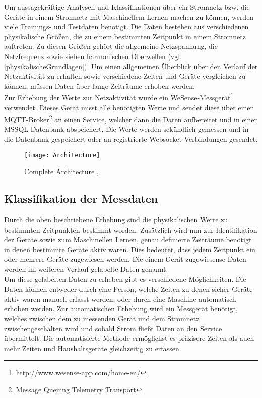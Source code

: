     Um aussagekräftige Analysen und Klassifikationen über ein Stromnetz bzw. die Geräte in einem Stromnetz mit Maschinellem Lernen machen zu können, werden viele Trainings- und Testdaten benötigt.
    Die Daten bestehen aus verschiedenen physikalische Größen, die zu einem bestimmten Zeitpunkt in einem Stromnetz auftreten.
    Zu diesen Größen gehört die allgemeine Netzspannung, die Netzfrequenz sowie sieben harmonischen Oberwellen (vgl. \ref{physikalischeGrundlagen}).
    Um einen allgemeinen Überblick über den Verlauf der Netzaktivität zu erhalten sowie verschiedene Zeiten und Geräte vergleichen zu können, müssen Daten über lange Zeiträume erhoben werden.\\
    \newline
    Zur Erhebung der Werte zur Netzaktivität wurde ein WeSense-Messgerät\footnote{http://www.wesense-app.com/home-en/} verwendet.
    Dieses Gerät misst alle benötigten Werte und sendet diese über einen MQTT-Broker\footnote{Message Queuing Telemetry Transport} an einen Service, welcher dann die Daten aufbereitet und in einer MSSQL Datenbank abspeichert.
    Die Werte werden sekündlich gemessen und in die Datenbank gespeichert oder an registrierte Websocket-Verbindungen gesendet.
    \newline

    \begin{figure}[h]
        \centering
        \texttt{[image: Architecture]}
        \caption{Complete Architecture \protect\cite{DrawIO}, \protect\cite{Tensorflow}}
        \label{fig:Architecture}
    \end{figure}

    \subsection{Klassifikation der Messdaten}\label{KlassifikationDerMessdaten}

        Durch die oben beschriebene Erhebung sind die physikalischen Werte zu bestimmten Zeitpunkten bestimmt worden.
        Zusätzlich wird nun zur Identifikation der Geräte sowie zum Maschinellen Lernen, genau definierte Zeiträume benötigt in denen bestimmte Geräte aktiv waren.
        Dies bedeutet, dass jedem Zeitpunkt ein oder mehrere Geräte zugewiesen werden. Die einem Gerät zugewiesense Daten werden im weiteren Verlauf gelabelte Daten genannt.\\
        \newline
        Um diese gelabelten Daten zu erheben gibt es verschiedene Möglichkeiten.
        Die Daten können entweder durch eine Person, welche Zeiten zu denen sicher Geräte aktiv waren manuell erfasst werden, oder durch eine Maschine automatisch erhoben werden.
        Zur automatischen Erhebung wird ein Messgerät benötigt, welches zwischen dem zu messenden Gerät und dem Stromnetz zwischengeschalten wird und sobald Strom fließt Daten an den Service übermittelt.
        Die automatisierte Methode ermöglichst es präzisere Zeiten als auch mehr Zeiten und Haushaltsgeräte gleichzeitig zu erfassen.

